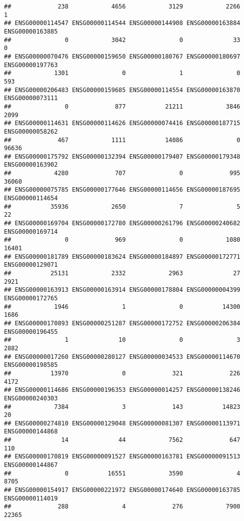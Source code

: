 \documentclass[
]{article}
\begin{document}
\begin{verbatim}
##             238            4656            3129            2266               1 
## ENSG00000114547 ENSG00000114544 ENSG00000144908 ENSG00000163884 ENSG00000163885 
##               0            3042               0              33               0 
## ENSG00000070476 ENSG00000159650 ENSG00000180767 ENSG00000180697 ENSG00000197763 
##            1301               0               1               0             593 
## ENSG00000206483 ENSG00000159685 ENSG00000114554 ENSG00000163870 ENSG00000073111 
##               0             877           21211            3846            2099 
## ENSG00000114631 ENSG00000114626 ENSG00000074416 ENSG00000187715 ENSG00000058262 
##             467            1111           14086               0           96636 
## ENSG00000175792 ENSG00000132394 ENSG00000179407 ENSG00000179348 ENSG00000163902 
##            4280             707               0             995           36060 
## ENSG00000075785 ENSG00000177646 ENSG00000114656 ENSG00000187695 ENSG00000114654 
##           35936            2650               7               5              22 
## ENSG00000169704 ENSG00000172780 ENSG00000261796 ENSG00000240682 ENSG00000169714 
##               0             969               0            1080           16401 
## ENSG00000181789 ENSG00000183624 ENSG00000184897 ENSG00000172771 ENSG00000129071 
##           25131            2332            2963              27            2921 
## ENSG00000163913 ENSG00000163914 ENSG00000178804 ENSG00000004399 ENSG00000172765 
##            1946               1               0           14300            1686 
## ENSG00000170893 ENSG00000251287 ENSG00000172752 ENSG00000206384 ENSG00000196455 
##               1              10               0               3            2882 
## ENSG00000017260 ENSG00000280127 ENSG00000034533 ENSG00000114670 ENSG00000198585 
##           13970               0             321             226            4172 
## ENSG00000114686 ENSG00000196353 ENSG00000014257 ENSG00000138246 ENSG00000240303 
##            7384               3             143           14823              20 
## ENSG00000274810 ENSG00000129048 ENSG00000081307 ENSG00000113971 ENSG00000144868 
##              14              44            7562             647             110 
## ENSG00000170819 ENSG00000091527 ENSG00000163781 ENSG00000091513 ENSG00000144867 
##               0           16551            3590               4            8705 
## ENSG00000154917 ENSG00000221972 ENSG00000174640 ENSG00000163785 ENSG00000114019 
##             288               4             276            7900           22365 

\end{verbatim}
\end{document}
